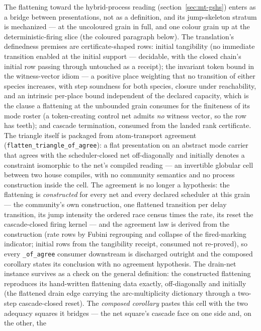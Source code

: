 The flattening toward the hybrid-process reading
(section~\ref{sec:mt-gshs}) enters as a bridge between presentations,
not as a definition, and its jump-skeleton stratum is mechanized ---
at the uncoloured grain in full, and one colour grain up at the
deterministic-firing slice (the coloured paragraph below).  The
translation's definedness premises are certificate-shaped rows:
initial tangibility (no immediate transition enabled at the initial
support --- decidable, with the closed chain's initial row passing
through untouched as a receipt); the invariant token bound in the
witness-vector idiom --- a positive place weighting that no
transition of either species increases, with step soundness for both
species, closure under reachability, and an intrinsic per-place bound
independent of the declared capacity, which is the clause a
flattening at the unbounded grain consumes for the finiteness of its
mode roster (a token-creating control net admits \emph{no} witness
vector, so the row has teeth); and cascade termination, consumed from
the landed rank certificate.  The triangle itself is packaged from
atom-transport agreement (\texttt{flatten\_triangle\_of\_agree}): a
flat presentation on an abstract mode carrier that agrees with the
scheduler-closed net off-diagonally and initially denotes a
constraint isomorphic to the net's compiled reading --- an invertible
globular cell between two house compiles, with no community semantics
and no process construction inside the cell.  The agreement is no
longer a hypothesis: the flattening is \emph{constructed} for every
net and every declared scheduler at this grain --- the community's
own construction, one flattened transition per delay transition,
its jump intensity the ordered race census times the rate, its
reset the cascade-closed firing kernel --- and the agreement law is
derived from the construction (rate rows by Fubini regrouping and
collapse of the fired-marking indicator; initial rows from the
tangibility receipt, consumed not re-proved), so every
\texttt{\_of\_agree} consumer downstream is discharged outright and
the composed corollary states its conclusion with no agreement
hypothesis.  The drain-net instance survives as a check on the
general definition: the constructed flattening reproduces its
hand-written flattening data exactly, off-diagonally and initially
(the flattened drain edge carrying the arc-multiplicity dictionary
through a two-step cascade-closed reset).  The \emph{composed
corollary} pastes this cell with the two adequacy squares it bridges
--- the net square's cascade face on one side and, on the other, the
